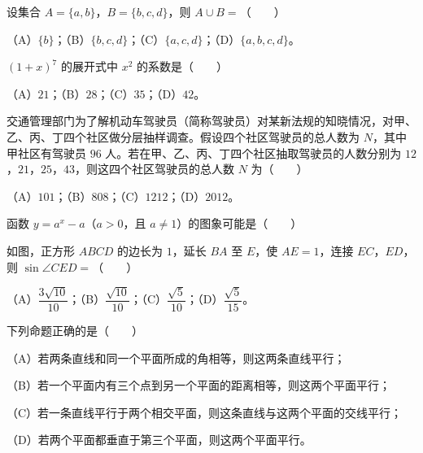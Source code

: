 

\begin{question}
设集合 $A=\{a,b\}$，$B=\{b,c,d\}$，则 $A\cup B=$\mbox{（　　）}

（A）$\{b\}$；（B）$\{b,c,d\}$；（C）$\{a,c,d\}$；（D）$\{a,b,c,d\}$。

\end{question}
\begin{question}
$(1+x)^7$ 的展开式中 $x^2$ 的系数是\mbox{（　　）}

（A）$21$；（B）$28$；（C）$35$；（D）$42$。

\end{question}
\begin{question}
交通管理部门为了解机动车驾驶员（简称驾驶员）对某新法规的知晓情况，对甲、乙、丙、丁四个社区做分层抽样调查。假设四个社区驾驶员的总人数为 $N$，其中甲社区有驾驶员 $96$ 人。若在甲、乙、丙、丁四个社区抽取驾驶员的人数分别为 $12$，$21$，$25$，$43$，则这四个社区驾驶员的总人数 $N$ 为\mbox{（　　）}

（A）$101$；（B）$808$；（C）$1212$；（D）$2012$。

\Needspace{0.4\textheight}
\end{question}
\begin{question}
函数 $y=a^x-a$（$a>0$，且 $a\neq1$）的图象可能是\mbox{（　　）}
\nopagebreak[4]
\begin{center}\end{center}
\nopagebreak[4]
\Needspace{0.4\textheight}
\end{question}
\begin{question}
如图，正方形 $ABCD$ 的边长为 $1$，延长 $BA$ 至 $E$，使 $AE=1$，连接 $EC$，$ED$，则 $\sin\angle CED=$\mbox{（　　）}
\nopagebreak[4]
\begin{center}\end{center}
\nopagebreak[4]
（A）$\dfrac{3\sqrt{10}}{10}$；（B）$\dfrac{\sqrt{10}}{10}$；（C）$\dfrac{\sqrt5}{10}$；（D）$\dfrac{\sqrt5}{15}$。

\end{question}
\begin{question}
下列命题正确的是\mbox{（　　）}

（A）若两条直线和同一个平面所成的角相等，则这两条直线平行；

（B）若一个平面内有三个点到另一个平面的距离相等，则这两个平面平行；

（C）若一条直线平行于两个相交平面，则这条直线与这两个平面的交线平行；

（D）若两个平面都垂直于第三个平面，则这两个平面平行。

\end{question}
